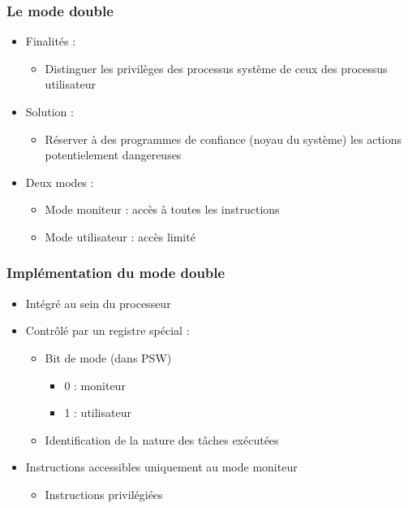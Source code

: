 \begin{frame}
 \frametitle{Le mode double}
 \begin{itemize}
 \item Finalités :
\begin{itemize}
\item Distinguer les privilèges des processus système de ceux des processus utilisateur
\end{itemize}
\item Solution :
\begin{itemize}
\item Réserver à des programmes de confiance (noyau du système) les actions potentielement dangereuses
\end{itemize}
\item Deux modes :
\begin{itemize}
\item Mode moniteur : accès à toutes les instructions
\item Mode utilisateur : accès limité
\end{itemize}
\end{itemize}
\end{frame}


\begin{frame}
 \frametitle{Implémentation du mode double}
 \begin{itemize}
 \item Intégré au sein du processeur
 \item Contrôlé par un registre spécial :
\begin{itemize}
\item Bit de mode (dans PSW)
\begin{itemize}
\item 0 : moniteur
\item 1 : utilisateur
\end{itemize}
\item Identification de la nature des tâches exécutées
\end{itemize}
\item Instructions accessibles uniquement au mode moniteur
\begin{itemize}
\item Instructions privilégiées
\end{itemize}
 \end{itemize}
\end{frame}


